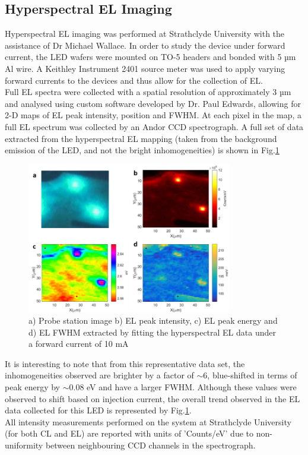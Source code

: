 \subsection{Hyperspectral EL Imaging}
Hyperspectral EL imaging was performed at Strathclyde University with the assistance of Dr Michael Wallace. In order to study the device under forward current, the LED wafers were mounted on TO-5 headers and bonded with 5 µm Al wire. A Keithley Instrument 2401 source meter was used to apply varying forward currents to the devices and thus allow for the collection of EL. \\
Full EL spectra were collected with a spatial resolution of approximately 3 µm and analysed using custom software developed by Dr. Paul Edwards, allowing for 2-D maps of EL peak intensity, position and FWHM. At each pixel in the map, a full EL spectrum was collected by an Andor CCD spectrograph. A full set of data extracted from the hyperspectral EL mapping (taken from the background emission of the LED, and not the bright inhomogeneities) is shown in Fig.\ref{ELfull}

\begin{figure}[!ht]
	\centering
	\includegraphics[width=0.8\textwidth]{Figs/Ch3/ELfull}
	\caption[h] {a) Probe station image b) EL peak intensity, c) EL peak energy and d) EL FWHM extracted by fitting the hyperspectral EL data under a forward current of 10 mA}
	\label{ELfull}
\end{figure}

\FloatBarrier 

It is interesting to note that from this representative data set, the inhomogeneities observed are brighter by a factor of $\sim 6$, blue-shifted in terms of peak energy by $\sim 0.08$ eV and have a larger FWHM. Although these values were observed to shift based on injection current, the overall trend observed in the EL data collected for this LED is represented by Fig.\ref{ELfull}.\\
All intensity measurements performed on the system at Strathclyde University (for both CL and EL) are reported with units of 'Counts/eV' due to non-uniformity between neighbouring CCD channels in the spectrograph.

